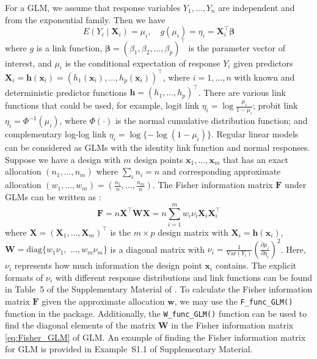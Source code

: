For a GLM, we assume that response variables $Y_1, \dots, Y_n$ are independent and from the exponential family. Then we have \citep{dobson2018, pmcc1989}
$$E(Y_i \mid \mathbf X_i) = \mu_i,\quad g(\mu_i)=\eta_i=\mathbf X_i^\top \boldsymbol \beta$$
where $g$ is a link function, $\boldsymbol \beta = (\beta_1, \beta_2,\dots, \beta_p)^\top$ is the parameter vector of interest, and $\mu_i$ is the conditional expectation of response $Y_i$ given predictors $\mathbf X_i = \mathbf h(\mathbf x_i) = (h_1(\mathbf x_i),\dots, h_p(\mathbf x_i))^\top$, where $i = 1, \dots, n$ with known and deterministic predictor functions $\mathbf h = (h_1, \dots, h_p)^\top$. There are various link functions that could be used, for example, logit link $\eta_i = \log\frac{\mu_i}{1-\mu_i}$; probit link $\eta_i = \Phi^{-1}(\mu_i)$, where $\Phi(\cdot)$ is the normal cumulative distribution function; and complementary log-log link $\eta_i = \log\{-\log(1-\mu_i)\}$. Regular linear models can be considered as GLMs with the identity link function and normal responses. Suppose we have a design with $m$ design points $\mathbf x_1, \dots, \mathbf x_m$ that has an exact allocation $(n_1,\dots,n_m)$ where $\sum_i n_i = n$ and corresponding approximate allocation $(w_1,\dots,w_m)=(\frac{n_1}{n},\dots,\frac{n_m}{n})$. The Fisher information matrix $\mathbf F$ under GLMs can be written as \citep{pmcc1989, khuri2006,stufken2012,ymm2016}:
\begin{equation}\label{eq:Fisher_GLM}
\mathbf F = n \mathbf X^\top \mathbf W \mathbf X = n\sum_{i=1}^m w_i \nu_i {\mathbf X}_i{\mathbf X}_i^\top
\end{equation}
where $\mathbf X = (\mathbf X_1, \dots, \mathbf X_m)^\top$ is the $m\times p$ design matrix with $\mathbf X_i = \mathbf h(\mathbf x_i)$, $\mathbf W = \text{diag}\{w_1\nu_1,$ $\dots, w_m\nu_m\}$ is a diagonal matrix with $\nu_i = \frac{1}{\text{Var}(Y_i)} (\frac{\partial \mu_i}{\partial \eta_i})^2$. Here, $\nu_i$ represents how much information the design point $\mathbf x_i$ contains. The explicit formats of $\nu_i$ with different response distributions and link functions can be found in Table~5 of the Supplementary Material of \cite{huang2023constrained}. To calculate the Fisher information matrix $\mathbf{F}$ given the approximate allocation $\mathbf{w}$, we may use the \texttt{F\_func\_GLM()} function in the  package. Additionally, the \texttt{W\_func\_GLM()} function can be used to find the diagonal elements of the matrix $\mathbf{W}$ in the Fisher information matrix \eqref{eq:Fisher_GLM} of GLM. An example of finding the Fisher information matrix for GLM is provided in Example~S1.1 of Supplementary Material.

